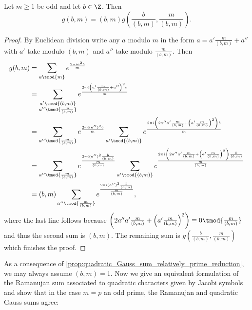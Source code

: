         \begin{proposition}\label{prop:quadratic_Gauss_sum_relatively_prime_reduction}
          Let $m \ge 1$ be odd and let $b \in \Z$. Then
          \[
            g(b,m) = (b,m)g\left(\frac{b}{(b,m)},\frac{m}{(b,m)}\right).
          \]
        \end{proposition}
        \begin{proof}
          By Euclidean division write any $a$ modulo $m$ in the form $a = a'\frac{m}{(b,m)}+a''$ with $a'$ take modulo $(b,m)$ and $a''$ take modulo $\frac{m}{(b,m)}$. Then
          \begin{align*}
            g(b,m) &= \sum_{a \tmod{m}}e^{\frac{2\pi ia^{2}b}{m}} \\
            &= \sum_{\substack{a' \tmod{(b,m)} \\ a'' \tmod{\frac{m}{(b,m)}}}}e^{\frac{2\pi i\left(a'\frac{m}{(b,m)}+a''\right)^{2}b}{m}} \\
            &= \sum_{a'' \tmod{\frac{m}{(b,m)}}}e^{\frac{2\pi i(a'')^{2}b}{m}}\sum_{a' \tmod{(b,m)}}e^{\frac{2\pi i\left(2a''a'\frac{m}{(b,m)}+\left(a'\frac{m}{(b,m)}\right)^{2}\right)b}{m}} \\
            &= \sum_{a'' \tmod{\frac{m}{(b,m)}}}e^{\frac{2\pi i(a'')^{2}\frac{b}{(b,m)}}{\frac{m}{(b,m)}}}\sum_{a' \tmod{(b,m)}}e^{\frac{2\pi i\left(2a''a'\frac{m}{(b,m)}+\left(a'\frac{m}{(b,m)}\right)^{2}\right)\frac{b}{(b,m)}}{\frac{m}{(b,m)}}} \\
            &= (b,m)\sum_{a'' \tmod{\frac{m}{(b,m)}}}e^{\frac{2\pi i(a'')^{2}\frac{b}{(b,m)}}{\frac{m}{(b,m)}}},
          \end{align*}
          where the last line follows because $\left(2a''a'\frac{m}{(b,m)}+\left(a'\frac{m}{(b,m)}\right)^{2}\right) \equiv 0 \tmod{\frac{m}{(b,m)}}$ and thus the second sum is $(b,m)$. The remaining sum is $g\left(\frac{b}{(b,m)},\frac{m}{(b,m)}\right)$ which finishes the proof.
        \end{proof}

        As a consequence of \cref{prop:quadratic_Gauss_sum_relatively_prime_reduction}, we may always assume $(b,m) = 1$. Now we give an equivalent formulation of the Ramanujan sum associated to quadratic characters given by Jacobi symbols and show that in the case $m = p$ an odd prime, the Ramanujan and quadratic Gauss sums agree:

